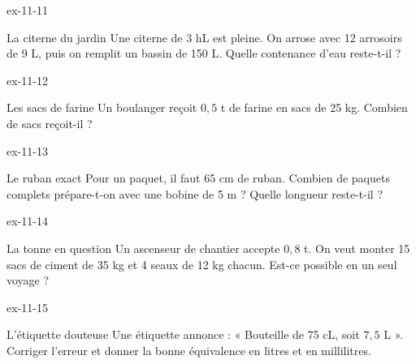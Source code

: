 \begin{blocLivre}{ex-11-11}\begin{exercice}[3]{La citerne du jardin}
Une citerne de 3 hL est pleine. On arrose avec 12 arrosoirs de 9 L, puis on remplit un bassin de 150 L. Quelle contenance d’eau reste-t-il ?
\end{exercice}\end{blocLivre}
\begin{blocLivre}{ex-11-12}\begin{exercice}[3]{Les sacs de farine}
Un boulanger reçoit $0{,}5$ t de farine en sacs de 25 kg. Combien de sacs reçoit-il ?
\end{exercice}\end{blocLivre}
\begin{blocLivre}{ex-11-13}\begin{exercice}[3]{Le ruban exact}
Pour un paquet, il faut 65 cm de ruban. Combien de paquets complets prépare-t-on avec une bobine de 5 m ? Quelle longueur reste-t-il ?
\end{exercice}\end{blocLivre}
\begin{blocLivre}{ex-11-14}\begin{exercice}[3]{La tonne en question}
Un ascenseur de chantier accepte $0{,}8$ t. On veut monter 15 sacs de ciment de 35 kg et 4 seaux de 12 kg chacun. Est-ce possible en un seul voyage ?
\end{exercice}\end{blocLivre}
\begin{blocLivre}{ex-11-15}\begin{exercice}[3]{L’étiquette douteuse}
Une étiquette annonce : « Bouteille de 75 cL, soit $7{,}5$ L ». Corriger l’erreur et donner la bonne équivalence en litres et en millilitres.
\end{exercice}\end{blocLivre}

\clearpage
